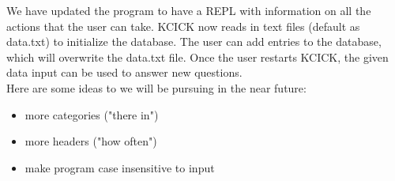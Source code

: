 \documentclass{article}
\begin{document}
We have updated the program to have a REPL with information on all the actions that the user can take. KCICK now reads in text files (default as data.txt) to initialize the database. The user can add entries to the database, which will overwrite the data.txt file. Once the user restarts KCICK, the given data input can be used to answer new questions. \\

Here are some ideas to we will be pursuing in the near future:
\begin{itemize}
    \item more categories ("there in")
    \item more headers ("how often")
    \item make program case insensitive to input
\end{itemize}
\end{document}
